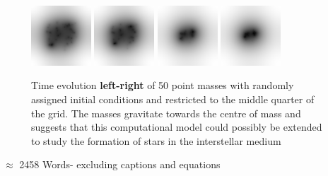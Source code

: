 \documentclass[10pt,a4paper]{article}
\begin{document}
\begin{figure}[h!]
\begin{center}
\includegraphics[width =0.2\textwidth]{t_0.4.eps}
\includegraphics[width =0.2\textwidth]{t_8.6.eps}
\includegraphics[width =0.2\textwidth]{t_17.4.eps}
\includegraphics[width =0.2\textwidth]{t_19.eps}
\caption{Time evolution \textbf{left-right} of 50 point masses with randomly assigned initial conditions and restricted to the middle quarter of the grid. The masses gravitate towards the centre of mass and suggests that this computational model could possibly be extended to study the formation of stars in the interstellar medium}
\label{fig:1992D3D}
\end{center}
\end{figure}

$\approx$ 2458 Words- excluding captions and equations
\end{document}
